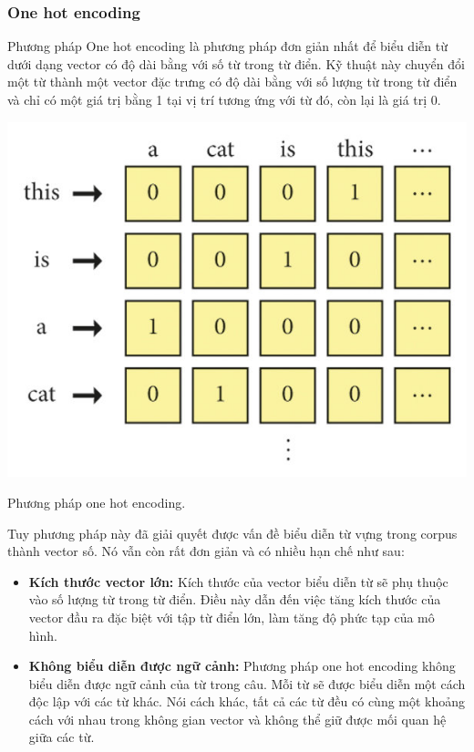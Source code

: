 \documentclass[a4paper, 12pt, openany]{book}
\begin{document}
\subsubsection{One hot encoding}
Phương pháp One hot encoding là phương pháp đơn giản nhất để biểu diễn từ dưới dạng vector có độ dài bằng với số từ trong từ điển.
Kỹ thuật này chuyển đổi một từ thành một vector đặc trưng có độ
dài bằng với số lượng từ trong từ điển và chỉ có một giá trị bằng 1 tại vị trí tương ứng với
từ đó, còn lại là giá trị 0.

\begin{minipage}{\linewidth}
    \captionsetup{type=figure}
    \centering
    \includegraphics[width=\linewidth]{./assets/images/onehot.png}
    \caption{Phương pháp one hot encoding.}
\end{minipage}
\vspace{0.5cm}

Tuy phương pháp này đã giải quyết được vấn đề biểu diễn từ vựng trong corpus thành 
vector số. Nó vẫn còn rất đơn giản và có nhiều hạn chế như sau:

\begin{itemize}
    \item \textbf{Kích thước vector lớn:} Kích thước của vector biểu diễn từ sẽ phụ thuộc vào số lượng từ trong từ điển. Điều này dẫn đến việc tăng kích thước của vector đầu ra đặc biệt với tập từ điển lớn, làm tăng độ phức tạp của mô hình.
    \item \textbf{Không biểu diễn được ngữ cảnh:} Phương pháp one hot encoding không biểu diễn được ngữ cảnh của từ trong câu. Mỗi từ sẽ được biểu diễn một cách độc lập với các từ khác.
    Nói cách khác, tất cả các từ đều có cùng một khoảng cách với nhau trong không gian vector và không thể giữ được mối quan hệ giữa các từ.
\end{itemize}
\end{document}
